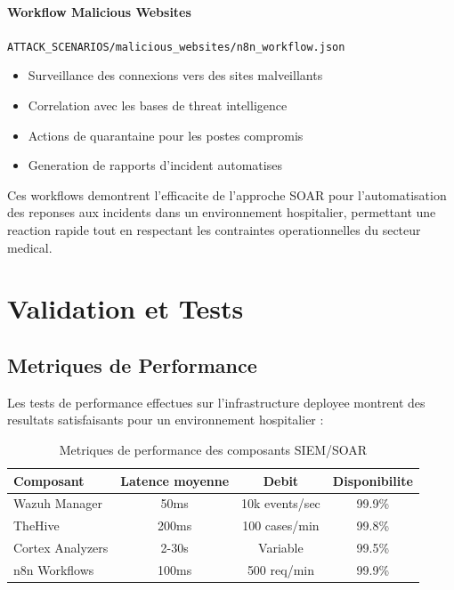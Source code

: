 \paragraph{Workflow Malicious Websites}
\texttt{ATTACK\_SCENARIOS/malicious\_websites/n8n\_workflow.json}
\begin{itemize}
    \item Surveillance des connexions vers des sites malveillants
    \item Correlation avec les bases de threat intelligence
    \item Actions de quarantaine pour les postes compromis
    \item Generation de rapports d'incident automatises
\end{itemize}

Ces workflows demontrent l'efficacite de l'approche SOAR pour l'automatisation des reponses aux incidents dans un environnement hospitalier, permettant une reaction rapide tout en respectant les contraintes operationnelles du secteur medical.

\section{Validation et Tests}

\subsection{Metriques de Performance}

Les tests de performance effectues sur l'infrastructure deployee montrent des resultats satisfaisants pour un environnement hospitalier :

\begin{table}[H]
    \centering
    \caption{Metriques de performance des composants SIEM/SOAR}
    \begin{tabular}{|l|c|c|c|}
        \hline
        \textbf{Composant} & \textbf{Latence moyenne} & \textbf{Debit} & \textbf{Disponibilite} \\
        \hline
        Wazuh Manager      & 50ms                     & 10k events/sec & 99.9\%                 \\
        \hline
        TheHive            & 200ms                    & 100 cases/min  & 99.8\%                 \\
        \hline
        Cortex Analyzers   & 2-30s                    & Variable       & 99.5\%                 \\
        \hline
        n8n Workflows      & 100ms                    & 500 req/min    & 99.9\%                 \\
        \hline
    \end{tabular}
\end{table}

